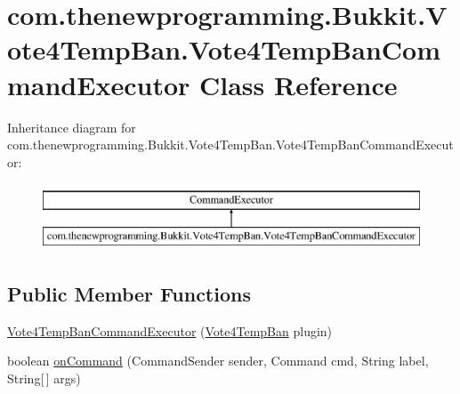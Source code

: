 \hypertarget{classcom_1_1thenewprogramming_1_1_bukkit_1_1_vote4_temp_ban_1_1_vote4_temp_ban_command_executor}{\section{com.\-thenewprogramming.\-Bukkit.\-Vote4\-Temp\-Ban.\-Vote4\-Temp\-Ban\-Command\-Executor Class Reference}
\label{classcom_1_1thenewprogramming_1_1_bukkit_1_1_vote4_temp_ban_1_1_vote4_temp_ban_command_executor}
}
Inheritance diagram for com.\-thenewprogramming.\-Bukkit.\-Vote4\-Temp\-Ban.\-Vote4\-Temp\-Ban\-Command\-Executor\-:\begin{figure}[H]
\begin{center}
\leavevmode
\includegraphics[height=2.000000cm]{classcom_1_1thenewprogramming_1_1_bukkit_1_1_vote4_temp_ban_1_1_vote4_temp_ban_command_executor}
\end{center}
\end{figure}
\subsection*{Public Member Functions}
\begin{DoxyCompactItemize}
\item 
\hyperlink{classcom_1_1thenewprogramming_1_1_bukkit_1_1_vote4_temp_ban_1_1_vote4_temp_ban_command_executor_ab50b7d12e16145edc69f36794b5bfa98}{Vote4\-Temp\-Ban\-Command\-Executor} (\hyperlink{classcom_1_1thenewprogramming_1_1_bukkit_1_1_vote4_temp_ban_1_1_vote4_temp_ban}{Vote4\-Temp\-Ban} plugin)
\item 
boolean \hyperlink{classcom_1_1thenewprogramming_1_1_bukkit_1_1_vote4_temp_ban_1_1_vote4_temp_ban_command_executor_a606f10fa3def3fc3c309e0c1cf0bb95b}{on\-Command} (Command\-Sender sender, Command cmd, String label, String\mbox{[}$\,$\mbox{]} args)
\end{DoxyCompactItemize}


